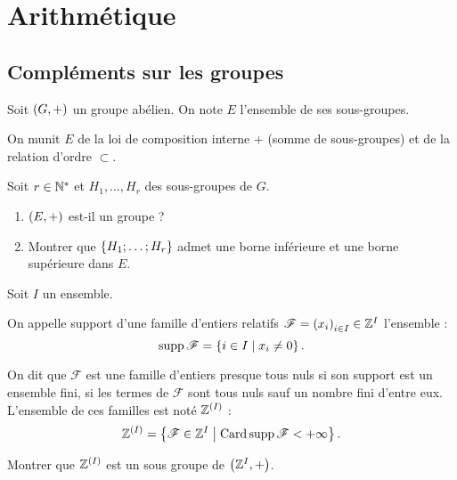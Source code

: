 \chapter{Arithmétique}

\minitoc

\section{Compléments sur les groupes}

\begin{exo}
Soit \(\groupe{G}\) un groupe abélien. On note \(E\) l'ensemble de ses sous-groupes.

On munit \(E\) de la loi de composition interne \(+\) (somme de sous-groupes) et de la relation d'ordre \(\subset\).

Soit \(r\in\mathbb{N}^*\) et \(H_1,\dots,H_r\) des sous-groupes de \(G\).

\begin{enumerate}
\item \(\groupe{E}\) est-il un groupe ? \\

\item Montrer que \(\left\lbrace H_1;\dots;H_r\right\rbrace\) admet une borne inférieure et une borne supérieure dans \(E\).
\end{enumerate}
\end{exo}

\begin{corr}
\end{corr}

\begin{exo}
\renewcommand{\F}{\mathscr{F}}

Soit \(I\) un ensemble.

On appelle support d'une famille d'entiers relatifs \(\F=\paren{x_i}_{i\in I}\in\Z^I\) l'ensemble : \[\supp\F=\accol{i\in I\tq x_i\not=0}.\]

On dit que \(\F\) est une famille d'entiers presque tous nuls si son support est un ensemble fini, \cad si les termes de \(\F\) sont tous nuls sauf un nombre fini d'entre eux. L'ensemble de ces familles est noté \(\mathbb{Z}^{\left(I\right)}\) : \[\Z^{\paren{I}}=\accol{\F\in\Z^I\tq\Card\supp\F<\pinf}.\]

Montrer que \(\mathbb{Z}^{\left(I\right)}\) est un sous groupe de \(\groupe{\Z^I}\).
\end{exo}

\begin{corr}
\end{corr}

